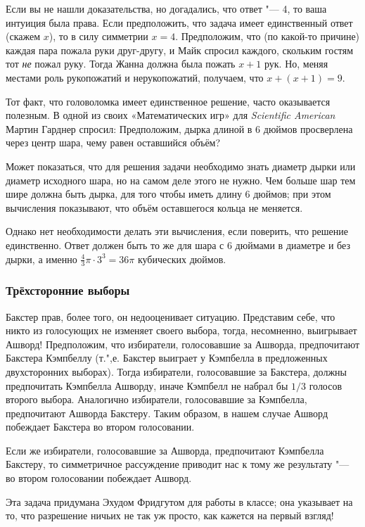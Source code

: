 \documentclass[twoside]{book}
\begin{document}
Если вы не нашли доказательства, но догадались, что ответ "--- 4, то ваша интуиция была права.
Если предположить, что задача имеет единственный ответ (скажем $x$), то в силу симметрии $x=4$.
Предположим, что (по какой-то причине) каждая пара пожала руки друг-другу, и Майк спросил каждого, скольким гостям тот \emph{не} пожал руку.
Тогда Жанна должна была пожать $x+1$ рук.
Но, меняя местами роль рукопожатий и нерукопожатий, получаем, что $x+(x+1)=9$.

Тот факт, что головоломка имеет единственное решение, часто оказывается полезным.
В одной из своих «Математических игр» для \emph{Scientific American} Мартин Гарднер спросил:
Предположим, дырка длиной в 6 дюймов просверлена через центр шара, чему равен оставшийся объём?

Может показаться, что для решения задачи необходимо знать диаметр дырки или диаметр исходного шара, но на самом деле этого не нужно.
Чем больше шар тем шире должна быть дырка, для того чтобы иметь длину 6 дюймов;
при этом вычисления показывают, что объём оставшегося кольца не меняется.

Однако нет необходимости делать эти вычисления, если поверить, что решение единственно.
Ответ должен быть то же для шара с 6 дюймами в диаметре и без дырки, а именно $\tfrac43 \pi \cdot 3^3=36\pi$ кубических дюймов.

\subsubsection*{Трёхсторонние выборы}%

Бакстер прав, более того, он недооценивает ситуацию.
Представим себе, что никто из голосующих не изменяет своего выбора, тогда, несомненно, выигрывает Ашворд!
Предположим, что избиратели, голосовавшие за Ашворда, предпочитают Бакстера Кэмпбеллу (т.",е. Бакстер выиграет у Кэмпбелла в предложенных двухсторонних выборах).
Тогда избиратели, голосовавшие за Бакстера, должны предпочитать
Кэмпбелла Ашворду, иначе Кэмпбелл не набрал бы $1/3$ голосов второго выбора.
Аналогично избиратели, голосовавшие за Кэмпбелла, предпочитают Ашворда
Бакстеру.
Таким образом, в нашем случае Ашворд побеждает Бакстера во втором
голосовании.

Если же избиратели, голосовавшие за Ашворда, предпочитают Кэмпбелла Бакстеру, то симметричное рассуждение приводит нас к тому же результату "--- во втором голосовании побеждает Ашворд.
\heart

Эта задача придумана Эхудом Фридгутом %
для работы в классе;
она указывает на то, что разрешение ничьих не так уж просто, как кажется на первый взгляд!
\end{document}
